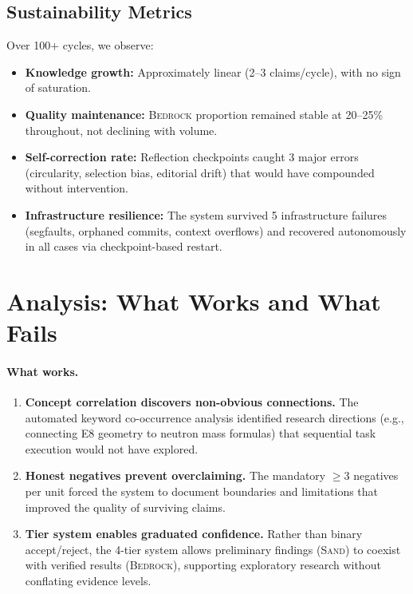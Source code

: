 \documentclass[11pt,a4paper]{article}
\newcommand{\bedrock}{\textsc{Bedrock}}
\newcommand{\sand}{\textsc{Sand}}
\begin{document}
\subsection{Sustainability Metrics}

Over 100+ cycles, we observe:

\begin{itemize}[nosep]
    \item \textbf{Knowledge growth:} Approximately linear (2--3 claims/cycle),
          with no sign of saturation.
    \item \textbf{Quality maintenance:} \bedrock{} proportion remained stable
          at 20--25\% throughout, not declining with volume.
    \item \textbf{Self-correction rate:} Reflection checkpoints caught 3 major
          errors (circularity, selection bias, editorial drift) that would have
          compounded without intervention.
    \item \textbf{Infrastructure resilience:} The system survived 5 infrastructure
          failures (segfaults, orphaned commits, context overflows) and recovered
          autonomously in all cases via checkpoint-based restart.
\end{itemize}

\section{Analysis: What Works and What Fails}
\label{sec:analysis}

\paragraph{What works.}
\begin{enumerate}[nosep]
    \item \textbf{Concept correlation discovers non-obvious connections.} The
          automated keyword co-occurrence analysis identified research directions
          (e.g., connecting E8 geometry to neutron mass formulas) that sequential
          task execution would not have explored.
    \item \textbf{Honest negatives prevent overclaiming.} The mandatory $\geq$3
          negatives per unit forced the system to document boundaries and limitations
          that improved the quality of surviving claims.
    \item \textbf{Tier system enables graduated confidence.} Rather than binary
          accept/reject, the 4-tier system allows preliminary findings (\sand{})
          to coexist with verified results (\bedrock{}), supporting exploratory
          research without conflating evidence levels.
\end{enumerate}
\end{document}
